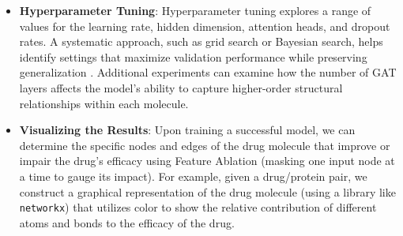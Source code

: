 \documentclass[fontsize=11pt]{article}
\begin{document}
\begin{itemize}
\begin{itemize}
        \quad An object-oriented Graph class is implemented to simplify the process of storing and retrieving molecular structures. This class keeps track of adjacency lists, node features, and bond attributes, and offers methods for adding nodes, adding edges, and retrieving neighbor information \cite{Chen2016}.

        \quad In addition, the \texttt{GATModel} class encapsulates the GAT layers, along with a residual connection and a fully connected layer for the final prediction. It provides a \texttt{forward(drug\_graph, protein\_embedding)} method returning an interaction probability. A \texttt{Trainer} class is also implemented to coordinate the training loop, including batch processing, loss computation, backpropagation, and metric logging \cite{Chen2016}.
    \end{itemize}

    \item \textbf{Hyperparameter Tuning}: Hyperparameter tuning explores a range of values for the learning rate, hidden dimension, attention heads, and dropout rates. A systematic approach, such as grid search or Bayesian search, helps identify settings that maximize validation performance while preserving generalization \cite{Kanakala2023}. Additional experiments can examine how the number of GAT layers affects the model’s ability to capture higher-order structural relationships within each molecule.
    
    \item \textbf{Visualizing the Results}: Upon training a successful model, we can determine the specific nodes and edges of the drug molecule that improve or impair the drug's efficacy using Feature Ablation (masking one input node at a time to gauge its impact). For example, given a drug/protein pair, we construct a graphical representation of the drug molecule (using a library like \texttt{networkx}) that utilizes color to show the relative contribution of different atoms and bonds to the efficacy of the drug.
    
\end{itemize}
\end{document}
